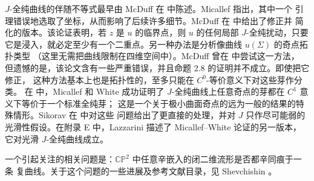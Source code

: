 $J$-全纯曲线的伴随不等式最早由 McDuff 在  中陈述。Micallef 指出，其中一个
引理错误地选取了坐标，从而影响了后续许多细节。McDuff 在  中给出了修正并
简化的版本。该论证表明，若 $z$ 是 $u$ 的临界点，则 $u$ 的任何局部
$J$-全纯扰动，只要它是浸入，就必定至少有一个二重点。另一种办法是分析像曲线
$u(\Sigma)$ 的奇点拓扑类型
（这里无需把曲线限制在四维空间中）。McDuff 曾在  中尝试这一方法，
但遗憾的是，该论文含有一些严重错误，并且命题 2.8 的证明并不成立。即使把它修正，
这种方法基本上也是拓扑性的，至多只能在 $C^0$-等价意义下对这些芽作分类。
在  中，Micallef 和 White 成功证明了 $J$-全纯曲线上任意奇点的芽都在
$C^1$ 意义下等价于一个标准全纯芽；
这是一个关于极小曲面奇点的远为一般的结果的特殊情形。Sikorav 在  中对这些
问题给出了更直接的处理，并对 $J$ 只作尽可能弱的光滑性假设。在附录 E 中，Lazzarini
描述了 Micallef--White 论证的另一版本，它对光滑 $J$-全纯曲线成立。

一个引起关注的相关问题是：$\mathbb{CP}^2$ 中任意辛嵌入的闭二维流形是否都辛同痕于一条
复曲线。关于这个问题的一些进展及参考文献目录，见 Shevchishin 。
